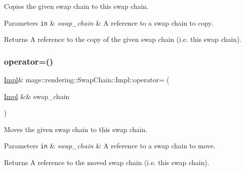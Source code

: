 Copies the given swap chain to this swap chain.


\begin{DoxyParams}[1]{Parameters}
\mbox{\tt in}  & {\em swap\+\_\+chain} & A reference to a swap chain to copy. \\
\hline
\end{DoxyParams}
\begin{DoxyReturn}{Returns}
A reference to the copy of the given swap chain (i.\+e. this swap chain). 
\end{DoxyReturn}
\mbox{\label{classmage_1_1rendering_1_1_swap_chain_1_1_impl_a4a1fe13cc2fa4e40a2616aa1d8698912}} 
\subsubsection{\texorpdfstring{operator=()}{operator=()}\hspace{0.1cm}{\footnotesize\ttfamily [2/2]}}
{\footnotesize\ttfamily \mbox{\hyperlink{classmage_1_1rendering_1_1_swap_chain_1_1_impl}{Impl}}\& mage\+::rendering\+::\+Swap\+Chain\+::\+Impl\+::operator= (\begin{DoxyParamCaption}\item[{\mbox{\hyperlink{classmage_1_1rendering_1_1_swap_chain_1_1_impl}{Impl}} \&\&}]{swap\+\_\+chain }\end{DoxyParamCaption})\hspace{0.3cm}{\ttfamily [delete]}}

Moves the given swap chain to this swap chain.


\begin{DoxyParams}[1]{Parameters}
\mbox{\tt in}  & {\em swap\+\_\+chain} & A reference to a swap chain to move. \\
\hline
\end{DoxyParams}
\begin{DoxyReturn}{Returns}
A reference to the moved swap chain (i.\+e. this swap chain). 
\end{DoxyReturn}
\mbox{\label{classmage_1_1rendering_1_1_swap_chain_1_1_impl_ae75839c2c767280d4c7e8ee009fedfe0}} 
